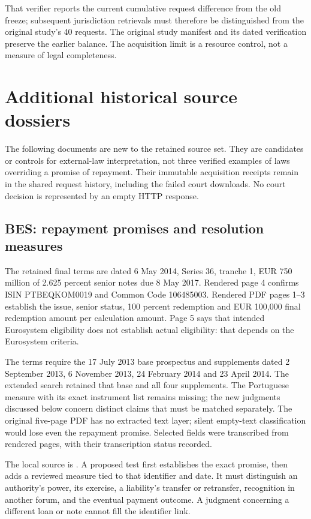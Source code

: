 That verifier reports the current cumulative request difference from the old
freeze; subsequent jurisdiction retrievals must therefore be distinguished
from the original study's 40 requests. The original study manifest and its
dated verification preserve the earlier balance. The acquisition limit is
a resource control, not a measure of legal completeness.


\section{Additional historical source dossiers}
\label{app:jurisdiction-candidates}

The following documents are new to the retained source set. They are
candidates or controls for external-law interpretation, not three verified
examples of laws overriding a promise of repayment. Their immutable acquisition
receipts remain in the shared request history, including the failed court
downloads. No court decision is represented by an empty HTTP response.

\subsection{BES: repayment promises and resolution measures}

The retained final terms are dated 6 May 2014, Series 36, tranche 1,
EUR 750 million of 2.625 percent senior notes due 8 May 2017. Rendered
page 4 confirms ISIN PTBEQKOM0019 and Common Code 106485003.
Rendered PDF pages 1--3 establish the issue, senior status, 100 percent
redemption and EUR 100,000 final redemption amount per calculation amount.
Page 5 says that intended Eurosystem eligibility does not establish actual
eligibility: that depends on the Eurosystem criteria.

The terms require the 17 July 2013 base prospectus and supplements dated
2 September 2013, 6 November 2013, 24 February 2014 and 23 April 2014.
The extended search retained that base and all four supplements. The
Portuguese measure with its exact instrument list remains missing; the
new judgments discussed below concern distinct claims that must be matched
separately. The original
five-page PDF has no extracted text layer; silent empty-text classification
would lose even the repayment promise. Selected fields were transcribed
from rendered pages, with their transcription status recorded.

The local source is
.
A proposed test first establishes the exact promise, then adds a reviewed
measure tied to that identifier and date. It must distinguish an authority's
power, its exercise, a liability's transfer or retransfer, recognition in
another forum, and the eventual payment outcome. A judgment concerning a
different loan or note cannot fill the identifier link.

